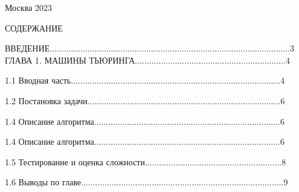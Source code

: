 \documentclass{article}
\begin{document}
\begin{center}
    \vspace{2.5cm}
    Москва 2023
\end{center}

\pagestyle{empty}

\vspace{5.0cm}

\begin{center}
    СОДЕРЖАНИЕ
\end{center}

\noindent
ВВЕДЕНИЕ......................................................................................................3\vspace{0.2cm}
ГЛАВА 1. МАШИНЫ ТЬЮРИНГА................................................................4\\
\vspace{-0.2cm}
\par1.1 Вводная часть.........................................................................................4\\
\vspace{-0.2cm}
\par 1.2 Постановка задачи..................................................................................6\\
\vspace{-0.2cm}
\par 1.4 Описание алгоритма...............................................................................6\\
\vspace{-0.2cm}
\par 1.4 Описание алгоритма...............................................................................6\\
\vspace{-0.2cm}
\par 1.5 Тестирование и оценка сложности..........................................................8\\
\vspace{-0.2cm}
\par 1.6 Выводы по главе......................................................................................9\\
\end{document}

